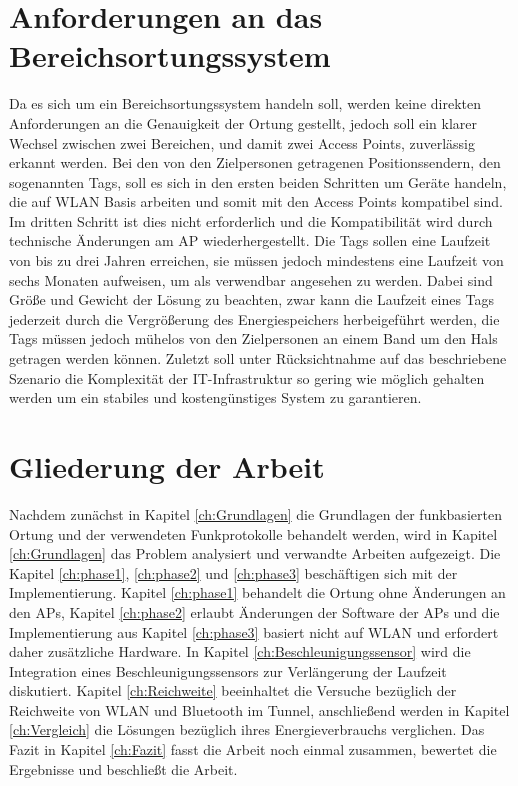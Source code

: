 \section{Anforderungen an das Bereichsortungssystem}
\label{ch:Einleitung:sec:Anforderungen}
Da es sich um ein Bereichsortungssystem handeln soll, werden keine direkten Anforderungen an die Genauigkeit der Ortung gestellt, jedoch soll ein klarer Wechsel zwischen zwei Bereichen, und damit zwei Access Points, zuverlässig erkannt werden. 
Bei den von den Zielpersonen getragenen Positionssendern, den sogenannten Tags, soll es sich in den ersten beiden Schritten um Geräte handeln, die auf WLAN Basis arbeiten und somit mit den Access Points kompatibel sind.
Im dritten Schritt ist dies nicht erforderlich und die Kompatibilität wird durch technische Änderungen am AP wiederhergestellt.
Die Tags sollen eine Laufzeit von bis zu drei Jahren erreichen, sie müssen jedoch mindestens eine Laufzeit von sechs Monaten aufweisen, um als verwendbar angesehen zu werden. 
Dabei sind Größe und Gewicht der Lösung zu beachten, zwar kann die Laufzeit eines Tags jederzeit durch die Vergrößerung des Energiespeichers herbeigeführt werden, die Tags müssen jedoch mühelos von den Zielpersonen an einem Band um den Hals getragen werden können.
Zuletzt soll unter Rücksichtnahme auf das beschriebene Szenario die Komplexität der IT-Infrastruktur so gering wie möglich gehalten werden um ein stabiles und kostengünstiges System zu garantieren. 


\section{Gliederung der Arbeit}
\label{ch:Einleitung:sec:Gliederung}
Nachdem zunächst in Kapitel \ref{ch:Grundlagen} die Grundlagen der funkbasierten Ortung und der verwendeten Funkprotokolle behandelt werden, wird in Kapitel \ref{ch:Grundlagen} das Problem analysiert und verwandte Arbeiten aufgezeigt.
Die Kapitel \ref{ch:phase1}, \ref{ch:phase2} und \ref{ch:phase3} beschäftigen sich mit der Implementierung. 
Kapitel \ref{ch:phase1} behandelt die Ortung ohne Änderungen an den APs, Kapitel \ref{ch:phase2} erlaubt Änderungen der Software der APs und die Implementierung aus Kapitel \ref{ch:phase3} basiert nicht auf WLAN und erfordert daher zusätzliche Hardware.
In Kapitel \ref{ch:Beschleunigungssensor} wird die Integration eines Beschleunigungssensors zur Verlängerung der Laufzeit diskutiert.
Kapitel \ref{ch:Reichweite} beeinhaltet die Versuche bezüglich der Reichweite von WLAN und Bluetooth im Tunnel, anschließend werden in Kapitel \ref{ch:Vergleich} die Lösungen bezüglich ihres Energieverbrauchs verglichen.
Das Fazit in Kapitel \ref{ch:Fazit} fasst die Arbeit noch einmal zusammen, bewertet die Ergebnisse und beschließt die Arbeit.
